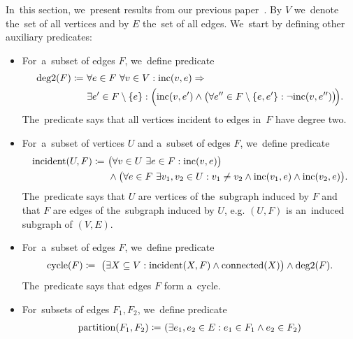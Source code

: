 In~this section, we~present results from our previous paper~\cite{my_paper}.
By \( V \) we~denote the~set of all vertices and
by \( E \) the~set of all edges.
We~start by defining other auxiliary predicates:
%
\begin{itemize}
	\item For~a~subset of edges \( F \), we~define predicate
	      \begin{align*}
		      \text{deg2}(F) \coloneqq \ 
		       & \forall e \in F \  \forall v \in V : \text{inc} (v, e) \Rightarrow                                                                      \\
		       & \exists e' \in F \setminus \{e\} : \Big( \text{inc} (v, e') \land \big(\forall e'' \in F \setminus \{e, e'\}: \lnot \text{inc} (v, e'')\big)\!\Big).
	      \end{align*}
	      The~predicate says that all vertices incident to edges in~\( F \) have degree two.
	\item For~a~subset of vertices \( U \) and a~subset of edges \( F \), we~define predicate
	      \begin{align*}
		      \text{incident}(U, F) \coloneqq \ 
		       & \big(\forall v \in U \  \exists e \in F : \text{inc} (v, e)\big)                                                       \\
		       & \land \big(\forall e \in F \  \exists v_1, v_2 \in U : v_1 \ne v_2 \land \text{inc} (v_1, e) \land \text{inc} (v_2, e)\big).
	      \end{align*}
	      The~predicate says that \( U \) are vertices of the~subgraph induced by \( F \)
	      and that \( F \) are edges of the~subgraph induced by \( U \),
	      e.g. \( (U, F) \) is an~induced subgraph of \( (V, E) \).
	\item For~a~subset of edges \( F \), we~define predicate
	      \begin{align*}
		      \text{cycle}(F) \coloneqq \ 
		      \big( \exists X \subseteq V : \text{incident}(X, F) \land \text{connected}(X) \big)
		      \land \text{deg2}(F).
	      \end{align*}
	      The~predicate says that edges \( F \) form a~cycle.
	\item For~subsets of edges \( F_1, F_2 \), we~define predicate
	      \begin{align*}
		      \text{partition}(F_1, F_2) \coloneqq \predsp
		       & (\exists e_1, e_2 \in E : e_1 \in F_1 \land e_2 \in F_2 )    \\

\end{align*}
\end{itemize}
